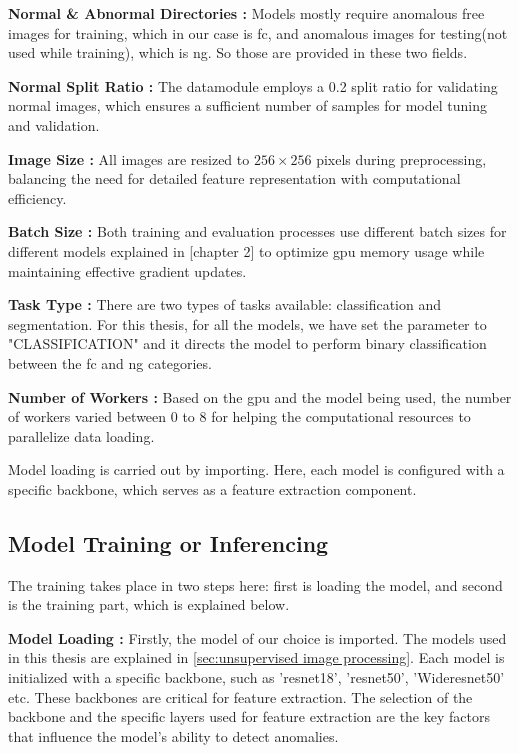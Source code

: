 \textbf{Normal \& Abnormal Directories :} Models mostly require anomalous free images for training, which in our case is \gls{fc}, and anomalous images for testing(not used while training), which is \gls{ng}. So those are provided in these two fields.

\textbf{Normal Split Ratio :} The datamodule employs a 0.2 split ratio for validating normal images, which ensures a sufficient number of samples for model tuning and validation.

\textbf{Image Size :} All images are resized to $256 \times 256$ pixels during preprocessing, balancing the need for detailed feature representation with computational efficiency.

\textbf{Batch Size :} Both training and evaluation processes use different batch sizes for different models explained in [chapter 2] to optimize \gls{gpu} memory usage while maintaining effective gradient updates.

\textbf{Task Type :} There are two types of tasks available: classification and segmentation. For this thesis, for all the models, we have set the parameter to "CLASSIFICATION" and it directs the model to perform binary classification between the \gls{fc} and \gls{ng} categories.

\textbf{Number of Workers :} Based on the \gls{gpu} and the model being used, the number of workers varied between 0 to 8 for helping the computational resources to parallelize data loading.

Model loading is carried out by importing. Here, each model is configured with a specific backbone, which serves as a feature extraction component. 

\subsection{Model Training or Inferencing}
\label{subsec:Model Training}

The training takes place in two steps here: first is loading the model, and second is the training part, which is explained below.

\textbf{Model Loading :} Firstly, the model of our choice is imported. The models used in this thesis are explained in \ref{sec:unsupervised image processing}. Each model is initialized with a specific backbone, such as '\gls{resnet}18', '\gls{resnet}50', 'Wide\gls{resnet}50' etc. These backbones are critical for feature extraction. The selection of the backbone and the specific layers used for feature extraction are the key factors that influence the model's ability to detect anomalies.

